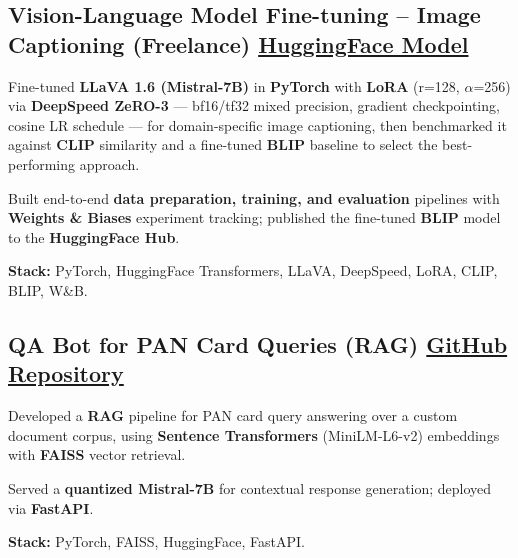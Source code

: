 \documentclass[letter,10pt]{article}
\begin{document}
\subsection{Vision-Language Model Fine-tuning – Image Captioning (Freelance) \hfill \href{https://huggingface.co/sunil448832/blip-model}{HuggingFace Model}}
\begin{zitemize}
\item Fine-tuned \textbf{LLaVA 1.6 (Mistral-7B)} in \textbf{PyTorch} with \textbf{LoRA} (r=128, $\alpha$=256) via \textbf{DeepSpeed ZeRO-3} --- bf16/tf32 mixed precision, gradient checkpointing, cosine LR schedule --- for domain-specific image captioning, then benchmarked it against \textbf{CLIP} similarity and a fine-tuned \textbf{BLIP} baseline to select the best-performing approach.
\item Built end-to-end \textbf{data preparation, training, and evaluation} pipelines with \textbf{Weights \& Biases} experiment tracking; published the fine-tuned \textbf{BLIP} model to the \textbf{HuggingFace Hub}.
\item \textbf{Stack:} PyTorch, HuggingFace Transformers, LLaVA, DeepSpeed, LoRA, CLIP, BLIP, W\&B.
\end{zitemize}

\subsection{QA Bot for PAN Card Queries (RAG) \hfill \href{https://github.com/sunil448832/Natural-Language-Processing/tree/master/RAG(Retrieval\%20Augment\%20Generation)}{GitHub Repository}}
\begin{zitemize}
\item Developed a \textbf{RAG} pipeline for PAN card query answering over a custom document corpus, using \textbf{Sentence Transformers} (MiniLM-L6-v2) embeddings with \textbf{FAISS} vector retrieval.
\item Served a \textbf{quantized Mistral-7B} for contextual response generation; deployed via \textbf{FastAPI}.
\item \textbf{Stack:} PyTorch, FAISS, HuggingFace, FastAPI.
\end{zitemize}
\end{document}
